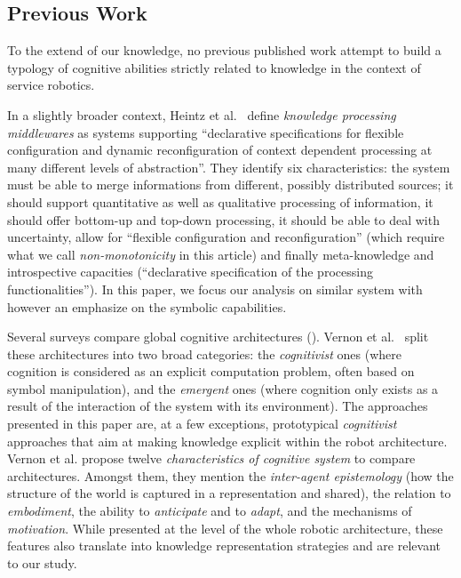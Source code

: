 \documentclass[a4paper, twocolumn]{article}
\begin{document}
\subsection{Previous Work}
\label{sect|evaluation-literature}

To the extend of our knowledge, no previous published work attempt to build a
typology of cognitive abilities strictly related to knowledge in the context of
service robotics.

In a slightly broader context, Heintz et al.~\cite{Heintz2008} define
\emph{knowledge processing middlewares} as systems supporting ``declarative
specifications for flexible configuration and dynamic reconfiguration of
context dependent processing at many different levels of abstraction''. They
identify six characteristics: the system must be able to merge informations
from different, possibly distributed sources; it should support quantitative as
well as qualitative processing of information, it should offer bottom-up and
top-down processing, it should be able to deal with uncertainty, allow for
``flexible configuration and reconfiguration'' (which require what we call
\emph{non-monotonicity} in this article) and finally meta-knowledge and
introspective capacities (``declarative specification of the processing
functionalities''). In this paper, we focus our analysis on similar system with
however an emphasize on the symbolic capabilities.

Several surveys compare global cognitive architectures (\cite{Vernon2007, Chong2009}).
Vernon et al.~\cite{Vernon2007} split these architectures into two broad
categories: the \emph{cognitivist} ones (where cognition is considered as an
explicit computation problem, often based on symbol manipulation), and the
\emph{emergent} ones (where cognition only exists as a result of the
interaction of the system with its environment). The approaches presented in
this paper are, at a few exceptions, prototypical \emph{cognitivist} approaches
that aim at making knowledge explicit within the robot architecture. Vernon et
al. propose twelve \emph{characteristics of cognitive system} to compare
architectures. Amongst them, they mention the \emph{inter-agent epistemology} (how
the structure of the world is captured in a representation and shared), the
relation to \emph{embodiment}, the ability to \emph{anticipate} and to
\emph{adapt}, and the mechanisms of \emph{motivation}. While presented at the
level of the whole robotic architecture, these features also translate into
knowledge representation strategies and are relevant to our study.
\end{document}
